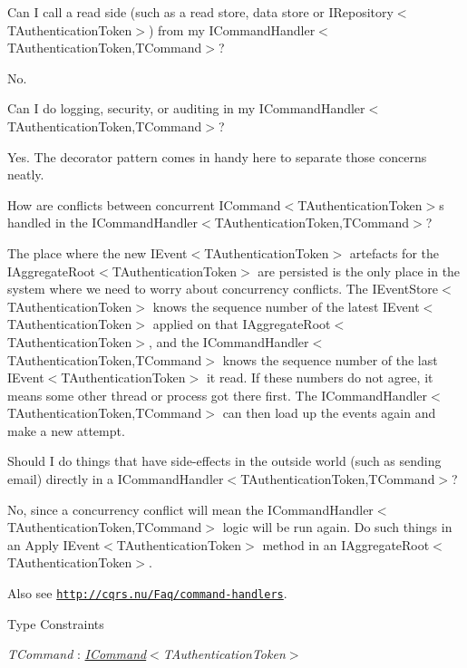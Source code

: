 Can I call a read side (such as a read store, data store or I\+Repository$<$\+T\+Authentication\+Token$>$) from my I\+Command\+Handler$<$\+T\+Authentication\+Token,\+T\+Command$>$?

No.

Can I do logging, security, or auditing in my I\+Command\+Handler$<$\+T\+Authentication\+Token,\+T\+Command$>$?

Yes. The decorator pattern comes in handy here to separate those concerns neatly.

How are conflicts between concurrent I\+Command$<$\+T\+Authentication\+Token$>$s handled in the I\+Command\+Handler$<$\+T\+Authentication\+Token,\+T\+Command$>$?

The place where the new I\+Event$<$\+T\+Authentication\+Token$>$ artefacts for the I\+Aggregate\+Root$<$\+T\+Authentication\+Token$>$ are persisted is the only place in the system where we need to worry about concurrency conflicts. The I\+Event\+Store$<$\+T\+Authentication\+Token$>$ knows the sequence number of the latest I\+Event$<$\+T\+Authentication\+Token$>$ applied on that I\+Aggregate\+Root$<$\+T\+Authentication\+Token$>$, and the I\+Command\+Handler$<$\+T\+Authentication\+Token,\+T\+Command$>$ knows the sequence number of the last I\+Event$<$\+T\+Authentication\+Token$>$ it read. If these numbers do not agree, it means some other thread or process got there first. The I\+Command\+Handler$<$\+T\+Authentication\+Token,\+T\+Command$>$ can then load up the events again and make a new attempt.

Should I do things that have side-\/effects in the outside world (such as sending email) directly in a I\+Command\+Handler$<$\+T\+Authentication\+Token,\+T\+Command$>$?

No, since a concurrency conflict will mean the I\+Command\+Handler$<$\+T\+Authentication\+Token,\+T\+Command$>$ logic will be run again. Do such things in an Apply I\+Event$<$\+T\+Authentication\+Token$>$ method in an I\+Aggregate\+Root$<$\+T\+Authentication\+Token$>$. 

 Also see \href{http://cqrs.nu/Faq/command-handlers}{\tt http\+://cqrs.\+nu/\+Faq/command-\/handlers}. \begin{Desc}
\item[Type Constraints]\begin{description}
\item[{\em T\+Command} : {\em \hyperlink{interfaceCqrs_1_1Commands_1_1ICommand}{I\+Command}$<$T\+Authentication\+Token$>$}]\end{description}
\end{Desc}
